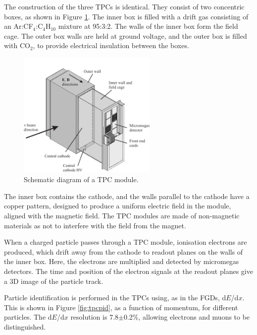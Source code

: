 The construction of the three TPCs is identical. They consist of two concentric boxes, as shown in Figure \ref{fig:tpcconstruction}. The inner box is filled with a drift gas consisting of an Ar:CF$_4$:C$_4$H$_{10}$ mixture at 95:3:2. The walls of the inner box form the field cage. The outer box walls are held at ground voltage, and the outer box is filled with CO$_2$, to provide electrical insulation between the boxes. 

\begin{figure}[!htbp]
\centering
\includegraphics*[width=0.6\textwidth,clip]{figs/tpc}
\caption{Schematic diagram of a TPC module.} \label{fig:tpcconstruction}
\end{figure}

The inner box contains the cathode, and the walls parallel to the cathode have a copper pattern, designed to produce a uniform electric field in the module, aligned with the magnetic field. The TPC modules are made of non-magnetic materials as not to interfere with the field from the magnet. 

When a charged particle passes through a TPC module, ionisation electrons are produced, which drift away from the cathode to readout planes on the walls of the inner box. Here, the electrons are multiplied and detected by micromegas detectors. The time and position of the electron signals at the readout planes give a 3D image of the particle track.

Particle identification is performed in the TPCs using, as in the FGDs, d$E$/d$x$. This is shown in Figure \ref{fig:tpcpid}, as a function of momentum, for different particles. The d$E$/d$x$ resolution is 7.8$\pm$0.2$\%$, allowing electrons and muons to be distinguished. 

